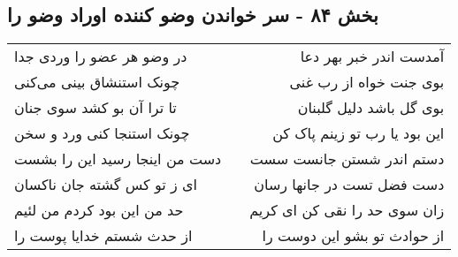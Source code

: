 \begin{center}
\section*{بخش ۸۴ - سر خواندن وضو کننده اوراد وضو را}
\label{sec:sh084}
\begin{longtable}{l p{0.5cm} r}
در وضو هر عضو را وردی جدا
&&
آمدست اندر خبر بهر دعا
\\
چونک استنشاق بینی می‌کنی
&&
بوی جنت خواه از رب غنی
\\
تا ترا آن بو کشد سوی جنان
&&
بوی گل باشد دلیل گلبنان
\\
چونک استنجا کنی ورد و سخن
&&
این بود یا رب تو زینم پاک کن
\\
دست من اینجا رسید این را بشست
&&
دستم اندر شستن جانست سست
\\
ای ز تو کس گشته جان ناکسان
&&
دست فضل تست در جانها رسان
\\
حد من این بود کردم من لئیم
&&
زان سوی حد را نقی کن ای کریم
\\
از حدث شستم خدایا پوست را
&&
از حوادث تو بشو این دوست را
\\
\end{longtable}
\end{center}

